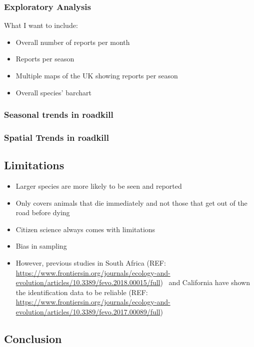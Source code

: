 \documentclass[
]{article}
\begin{document}
\subsubsection{Exploratory Analysis}\label{exploratory-analysis}

What I want to include:

\begin{itemize}
\item
  Overall number of reports per month
\item
  Reports per season
\item
  Multiple maps of the UK showing reports per season
\item
  Overall species' barchart
\end{itemize}

\subsubsection{Seasonal trends in
roadkill}\label{seasonal-trends-in-roadkill}

\subsubsection{Spatial Trends in
roadkill}\label{spatial-trends-in-roadkill}

\subsection{Limitations}\label{limitations}

\begin{itemize}
\item
  Larger species are more likely to be seen and reported
\item
  Only covers animals that die immediately and not those that get out of
  the road before dying
\item
  Citizen science always comes with limitations~~~~~
\item
  Bias in sampling
\item
  However, previous studies in South Africa (REF:
  \url{https://www.frontiersin.org/journals/ecology-and-evolution/articles/10.3389/fevo.2018.00015/full})
  ~and California have shown the identification data to be reliable
  (REF:
  \url{https://www.frontiersin.org/journals/ecology-and-evolution/articles/10.3389/fevo.2017.00089/full})
\end{itemize}

\subsection{Conclusion}\label{conclusion}
\end{document}
